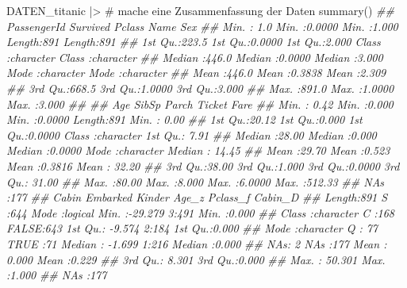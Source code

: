 \documentclass[
  10pt,
  letterpaper,
  a4paper, twoside]{scrreprt}
\newenvironment{Shaded}{\begin{snugshade}}{\end{snugshade}}
\newcommand{\CommentTok}[1]{\textcolor[rgb]{0.37,0.37,0.37}{#1}}
\newcommand{\DocumentationTok}[1]{\textcolor[rgb]{0.37,0.37,0.37}{\textit{#1}}}
\newcommand{\FunctionTok}[1]{\textcolor[rgb]{0.28,0.35,0.67}{#1}}
\newcommand{\NormalTok}[1]{\textcolor[rgb]{0.00,0.23,0.31}{#1}}
\newcommand{\SpecialCharTok}[1]{\textcolor[rgb]{0.37,0.37,0.37}{#1}}
\begin{document}
\begin{Shaded}
\begin{Highlighting}[]
\NormalTok{DATEN\_titanic }\SpecialCharTok{|\textgreater{}} \CommentTok{\# mache eine Zusammenfassung der Daten}
  \FunctionTok{summary}\NormalTok{() }
\DocumentationTok{\#\#   PassengerId       Survived          Pclass          Name               Sex           }
\DocumentationTok{\#\#  Min.   :  1.0   Min.   :0.0000   Min.   :1.000   Length:891         Length:891        }
\DocumentationTok{\#\#  1st Qu.:223.5   1st Qu.:0.0000   1st Qu.:2.000   Class :character   Class :character  }
\DocumentationTok{\#\#  Median :446.0   Median :0.0000   Median :3.000   Mode  :character   Mode  :character  }
\DocumentationTok{\#\#  Mean   :446.0   Mean   :0.3838   Mean   :2.309                                        }
\DocumentationTok{\#\#  3rd Qu.:668.5   3rd Qu.:1.0000   3rd Qu.:3.000                                        }
\DocumentationTok{\#\#  Max.   :891.0   Max.   :1.0000   Max.   :3.000                                        }
\DocumentationTok{\#\#                                                                                        }
\DocumentationTok{\#\#       Age            SibSp           Parch           Ticket               Fare       }
\DocumentationTok{\#\#  Min.   : 0.42   Min.   :0.000   Min.   :0.0000   Length:891         Min.   :  0.00  }
\DocumentationTok{\#\#  1st Qu.:20.12   1st Qu.:0.000   1st Qu.:0.0000   Class :character   1st Qu.:  7.91  }
\DocumentationTok{\#\#  Median :28.00   Median :0.000   Median :0.0000   Mode  :character   Median : 14.45  }
\DocumentationTok{\#\#  Mean   :29.70   Mean   :0.523   Mean   :0.3816                      Mean   : 32.20  }
\DocumentationTok{\#\#  3rd Qu.:38.00   3rd Qu.:1.000   3rd Qu.:0.0000                      3rd Qu.: 31.00  }
\DocumentationTok{\#\#  Max.   :80.00   Max.   :8.000   Max.   :6.0000                      Max.   :512.33  }
\DocumentationTok{\#\#  NA\textquotesingle{}s   :177                                                                         }
\DocumentationTok{\#\#     Cabin           Embarked     Kinder            Age\_z         Pclass\_f    Cabin\_D     }
\DocumentationTok{\#\#  Length:891         S   :644   Mode :logical   Min.   :{-}29.279   3:491    Min.   :0.000  }
\DocumentationTok{\#\#  Class :character   C   :168   FALSE:643       1st Qu.: {-}9.574   2:184    1st Qu.:0.000  }
\DocumentationTok{\#\#  Mode  :character   Q   : 77   TRUE :71        Median : {-}1.699   1:216    Median :0.000  }
\DocumentationTok{\#\#                     NA\textquotesingle{}s:  2   NA\textquotesingle{}s :177       Mean   :  0.000            Mean   :0.229  }
\DocumentationTok{\#\#                                                3rd Qu.:  8.301            3rd Qu.:0.000  }
\DocumentationTok{\#\#                                                Max.   : 50.301            Max.   :1.000  }
\DocumentationTok{\#\#                                                NA\textquotesingle{}s   :177}
\end{Highlighting}
\end{Shaded}
\end{document}
